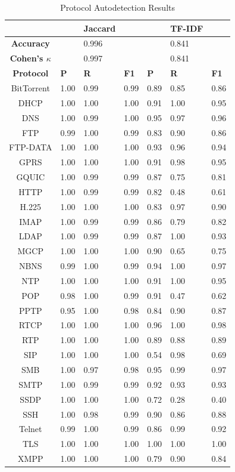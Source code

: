 \begin{table}
\caption{Protocol Autodetection Results}
\centering
\begin{tabular}{| c | p{0.6cm}  p{0.6cm}  p{0.6cm} || p{0.6cm}  p{0.6cm}  p{0.6cm} |}
\hline
& & \textbf{Jaccard} & & & \textbf{TF-IDF} & \\
\hline
\hline
\textbf{Accuracy} & & 0.996 & & & 0.841 & \\
\textbf{Cohen's $\kappa$} & & 0.997 & & & 0.841 & \\
\hline
\hline
 \textbf{Protocol} & \textbf{P} & \textbf{R} & \textbf{F1} & \textbf{P} & \textbf{R} & \textbf{F1} \\
 \hline
 BitTorrent & 1.00 & 0.99 & 0.99 & 0.89 & 0.85 & 0.86 \\
 DHCP & 1.00 & 1.00 & 1.00 & 0.91 & 1.00 & 0.95 \\
 DNS & 1.00 & 0.99 & 1.00 & 0.95 & 0.97 & 0.96 \\
 FTP & 0.99 & 1.00 & 0.99 & 0.83 & 0.90 & 0.86 \\
 FTP-DATA & 1.00 & 1.00 & 1.00 & 0.93 & 0.96 & 0.94 \\
 GPRS & 1.00 & 1.00 & 1.00 & 0.91 & 0.98 & 0.95 \\
 GQUIC & 1.00 & 0.99 & 0.99 & 0.87 & 0.75 & 0.81 \\
 HTTP & 1.00 & 0.99 & 0.99 & 0.82 & 0.48 & 0.61 \\
 H.225 & 1.00 & 1.00 & 1.00 & 0.83 & 0.97 & 0.90 \\
 IMAP & 1.00 & 0.99 & 0.99 & 0.86 & 0.79 & 0.82\\
 LDAP & 1.00 & 0.99 & 0.99 & 0.87 & 1.00 & 0.93 \\
 MGCP & 1.00 & 1.00 & 1.00 & 0.90 & 0.65 & 0.75 \\
 NBNS & 0.99 & 1.00 & 0.99 & 0.94 & 1.00 & 0.97 \\
 NTP & 1.00 & 1.00 & 1.00 & 0.91 & 1.00 & 0.95 \\
 POP & 0.98 & 1.00 & 0.99 & 0.91 & 0.47 & 0.62 \\
 PPTP & 0.95 & 1.00 & 0.98 & 0.84 & 0.90 & 0.87 \\
 RTCP & 1.00 & 1.00 & 1.00 & 0.96 & 1.00 & 0.98 \\
 RTP & 1.00 & 1.00 & 1.00 & 0.89 & 0.88 & 0.89\\
 SIP & 1.00 & 1.00 & 1.00 & 0.54 & 0.98 & 0.69 \\
 SMB & 1.00 & 0.97 & 0.98 & 0.95 & 0.99 & 0.97 \\
 SMTP & 1.00 & 0.99 & 0.99 & 0.92 & 0.93 & 0.93 \\
 SSDP & 1.00 & 1.00 & 1.00 & 0.72 & 0.28 & 0.40 \\
 SSH & 1.00 & 0.98 & 0.99 & 0.90 & 0.86 & 0.88 \\
 Telnet & 0.99 & 1.00 & 0.99 & 0.86 & 0.99 & 0.92 \\
 TLS & 1.00 & 1.00 & 1.00 & 1.00 & 1.00 & 1.00 \\
 XMPP & 1.00 & 1.00 & 1.00 & 0.79 & 0.90 & 0.84 \\
 \hline
\end{tabular}
\label{table:results1}
\end{table}

